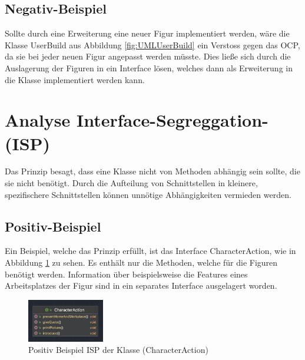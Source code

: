 \subsection{Negativ-Beispiel}
Sollte durch eine Erweiterung eine neuer Figur implementiert werden, wäre die Klasse UserBuild aus Abbildung \ref{fig:UMLUserBuild} ein Verstoss gegen das OCP, da sie bei jeder neuen Figur angepasst werden müsste. Dies ließe sich durch die Auslagerung der Figuren in ein Interface lösen, welches dann als Erweiterung in die Klasse implementiert werden kann.
\section{Analyse Interface-Segreggation- (ISP)}
Das Prinzip besagt, dass eine Klasse nicht von Methoden abhängig sein sollte, die sie nicht benötigt. Durch die Aufteilung von Schnittstellen in kleinere, spezifischere Schnittstellen können unnötige Abhängigkeiten vermieden werden.
\subsection{Positiv-Beispiel}
Ein Beispiel, welche das Prinzip erfüllt, ist das Interface CharacterAction, wie in Abbildung \ref{fig:UMLCharacterAction} zu sehen. Es enthält nur die Methoden, welche für die Figuren benötigt werden. Information über beispielsweise die Features eines Arbeitsplatzes der Figur sind in ein separates Interface ausgelagert worden.
\begin{figure}[ht]
    \centering
    \includegraphics[width=0.3\textwidth]{Bilder/CI.png}
    \caption{Positiv Beispiel ISP der Klasse (CharacterAction)}
    \label{fig:UMLCharacterAction}
\end{figure}

